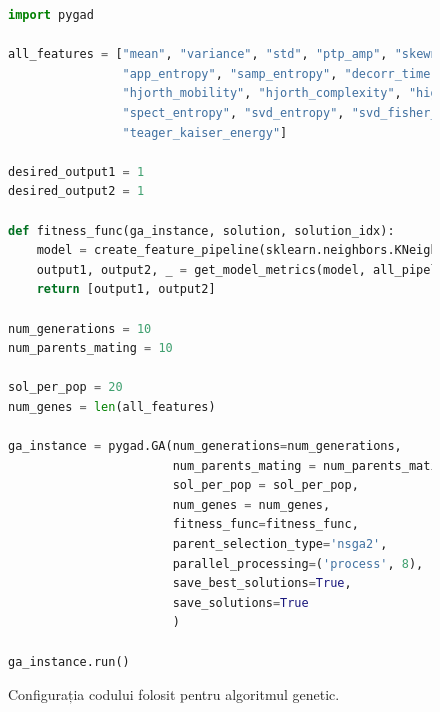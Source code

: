\begin{figure}
\begin{lstlisting}[language=Python]
import pygad

all_features = ["mean", "variance", "std", "ptp_amp", "skewness", "kurtosis", "rms", "quantile", "hurst_exp",
                "app_entropy", "samp_entropy", "decorr_time", "pow_freq_bands", "hjorth_mobility_spect", "hjorth_complexity_spect",
                "hjorth_mobility", "hjorth_complexity", "higuchi_fd", "katz_fd", "zero_crossings", "line_length", "spect_slope",
                "spect_entropy", "svd_entropy", "svd_fisher_info", "energy_freq_bands", "spect_edge_freq", "wavelet_coef_energy",
                "teager_kaiser_energy"]

desired_output1 = 1
desired_output2 = 1

def fitness_func(ga_instance, solution, solution_idx):
    model = create_feature_pipeline(sklearn.neighbors.KNeighborsClassifier(), [x[0] for x in zip(all_features, solution) if x[1] > 0])
    output1, output2, _ = get_model_metrics(model, all_pipelines)
    return [output1, output2]

num_generations = 10
num_parents_mating = 10

sol_per_pop = 20
num_genes = len(all_features)

ga_instance = pygad.GA(num_generations=num_generations,
                       num_parents_mating = num_parents_mating,
                       sol_per_pop = sol_per_pop,
                       num_genes = num_genes,
                       fitness_func=fitness_func,
                       parent_selection_type='nsga2',
                       parallel_processing=('process', 8),
                       save_best_solutions=True,
                       save_solutions=True
                       )

ga_instance.run()
\end{lstlisting}
\caption{Configurația codului folosit pentru algoritmul genetic.}
\label{fig:pygad_configuration}
\end{figure}

